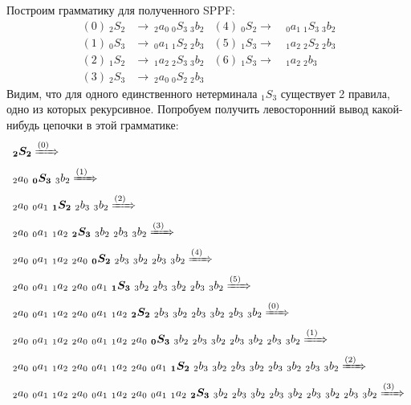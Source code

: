     \begin{example}
    Построим грамматику для полученного SPPF:
    \begin{align*}
        (0)\ _2S_2  & \to\ _2a_0\ _0S_3\ _3b_2   &(4)\ _0S_2 \to\ &_0a_1\ _1S_3\ _3b_2 \\
        (1)\ _0S_3  & \to\ _0a_1\ _1S_2\ _2b_3   &(5)\ _1S_3 \to\ &_1a_2\ _2S_2\ _2b_3 \\
        (2)\ _1S_2  & \to\ _1a_2\ _2S_3\ _3b_2   &(6)\ _1S_3 \to\ &_1a_2\ _2b_3 \\
        (3)\ _2S_3  & \to\ _2a_0\ _0S_2\ _2b_3   &
    \end{align*}
    Видим, что для одного единственного нетерминала $_1S_3$ существует 2 правила, одно из которых рекурсивное. Попробуем получить левосторонний вывод какой-нибудь цепочки в этой грамматике:
    \begin{align*}
        & \boldsymbol{_2S_2} \xRightarrow{(0)\ } \\
        & {_2a_0}\ \boldsymbol{_0S_3}\ {_3b_2} \xRightarrow{(1)\ } \\
        & {_2a_0}\ {_0a_1}\ \boldsymbol{_1S_2}\ {_2b_3}\ {_3b_2} \xRightarrow{(2)\ } \\
        & {_2a_0}\ {_0a_1}\ {_1a_2}\ \boldsymbol{_2S_3}\ {_3b_2}\ {_2b_3}\ {_3b_2} \xRightarrow{(3)\ } \\
        & {_2a_0}\ {_0a_1}\ {_1a_2}\ {_2a_0}\ \boldsymbol{_0S_2}\ {_2b_3}\ {_3b_2}\ {_2b_3}\ {_3b_2} \xRightarrow{(4)\ } \\
        & {_2a_0}\ {_0a_1}\ {_1a_2}\ {_2a_0}\ {_0a_1}\ \boldsymbol{_1S_3}\ {_3b_2}\ {_2b_3}\ {_3b_2}\ {_2b_3}\ {_3b_2} \xRightarrow{(5)\ } \\
        & {_2a_0}\ {_0a_1}\ {_1a_2}\ {_2a_0}\ {_0a_1}\ {_1a_2}\ \boldsymbol{_2S_2}\ {_2b_3}\ {_3b_2}\ {_2b_3}\ {_3b_2}\ {_2b_3}\ {_3b_2} \xRightarrow{(0)\ } \\
        & {_2a_0}\ {_0a_1}\ {_1a_2}\ {_2a_0}\ {_0a_1}\ {_1a_2}\ {_2a_0}\ \boldsymbol{_0S_3}\ {_3b_2}\ {_2b_3}\ {_3b_2}\ {_2b_3}\ {_3b_2}\ {_2b_3}\ {_3b_2} \xRightarrow{(1)\ } \\
        & {_2a_0}\ {_0a_1}\ {_1a_2}\ {_2a_0}\ {_0a_1}\ {_1a_2}\ {_2a_0}\ {_0a_1}\ \boldsymbol{_1S_2}\ {_2b_3}\ {_3b_2}\ {_2b_3}\ {_3b_2}\ {_2b_3}\ {_3b_2}\ {_2b_3}\ {_3b_2} \xRightarrow{(2)\ } \\
        & {_2a_0}\ {_0a_1}\ {_1a_2}\ {_2a_0}\ {_0a_1}\ {_1a_2}\ {_2a_0}\ {_0a_1}\ {_1a_2}\ \boldsymbol{_2S_3}\ {_3b_2}\ {_2b_3}\ {_3b_2}\ {_2b_3}\ {_3b_2}\ {_2b_3}\ {_3b_2}\ {_2b_3}\ {_3b_2} \xRightarrow{(3)\ } \\

\end{align*}
\end{example}
